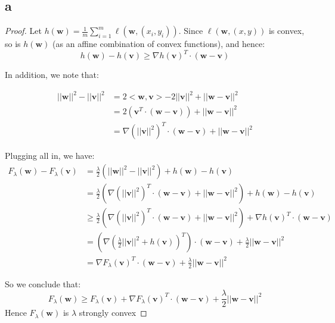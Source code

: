 \subsection*{a}
\begin{proof}    
    Let $h(\pmb{w}) = \frac{1}{m}\sum_{i=1}^m \ell\left(\pmb{w}, (x_i, y_i)\right)$. Since $\ell\left(\pmb{w}, (x, y)\right)$ is convex, so is $h(\pmb{w})$ (as an affine combination of convex functions), and hence:
    \begin{equation*}
        h(\pmb{w}) - h(\pmb{v}) \geq \nabla h(\pmb{v})^T \cdot (\pmb{w}-\pmb{v})
    \end{equation*}
    
    In addition, we note that:
    
    \begin{equation*}
        \begin{split}            
            ||\pmb{w}||^2 - ||\pmb{v}||^2 &= 2<\pmb{w}, \pmb{v}> - 2||\pmb{v}||^2 + ||\pmb{w} - \pmb{v}||^2 \\
            &= 2\left(\pmb{v}^T \cdot (\pmb{w} - \pmb{v}) \right) + ||\pmb{w} - \pmb{v}||^2 \\
            &= \nabla(||\pmb{v}||^2)^T \cdot (\pmb{w} - \pmb{v}) + ||\pmb{w} - \pmb{v}||^2
        \end{split}
    \end{equation*}
    
    Plugging all in, we have:
    \begin{equation*}
        \begin{split}
            F_\lambda(\pmb{w}) - F_\lambda(\pmb{v}) &= \frac{\lambda}{2}(||\pmb{w}||^2 - ||\pmb{v}||^2) + h(\pmb{w}) - h(\pmb{v}) \\ 
            &= \frac{\lambda}{2}\left(\nabla(||\pmb{v}||^2)^T \cdot (\pmb{w} - \pmb{v}) + ||\pmb{w} - \pmb{v}||^2\right) + h(\pmb{w}) - h(\pmb{v}) \\
            &\geq \frac{\lambda}{2}\left(\nabla(||\pmb{v}||^2)^T \cdot (\pmb{w} - \pmb{v}) + ||\pmb{w} - \pmb{v}||^2\right) + \nabla h(\pmb{v})^T \cdot (\pmb{w}-\pmb{v}) \\
            &= \left(\nabla(\frac{\lambda}{2}||\pmb{v}||^2 + h(\pmb{v}))^T\right) \cdot (\pmb{w} - \pmb{v}) + \frac{\lambda}{2}||\pmb{w} - \pmb{v}||^2 \\
            &= \nabla F_\lambda(\pmb{v})^T \cdot(\pmb{w} - \pmb{v}) + \frac{\lambda}{2}||\pmb{w} - \pmb{v}||^2
        \end{split}
    \end{equation*}
    
    So we conclude that:
    \begin{equation*}
        F_\lambda(\pmb{w}) \geq F_\lambda(\pmb{v}) + \nabla F_\lambda(\pmb{v})^T \cdot(\pmb{w} - \pmb{v}) + \frac{\lambda}{2}||\pmb{w} - \pmb{v}||^2
    \end{equation*}
    Hence $F_\lambda(\pmb{w})$ is $\lambda$ strongly convex
\end{proof}

